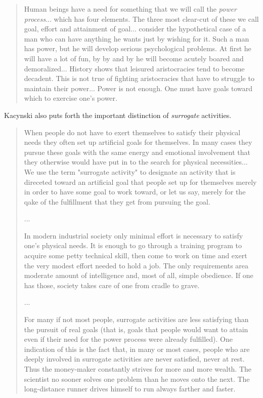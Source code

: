 \documentclass[letterpaper]{article}
\begin{document}
\begin{quote}
Human beings have a need for something that we will call the \textit{power process}... which has four elements. The three most clear-cut of these we call goal, effort and attainment of goal... consider the hypothetical case of a man who can have anything he wants just by wishing for it. Such a man has power, but he will develop serious psychological problems. At first he will have a lot of fun, by by and by he will become acutely boared and demoralized... History shows that leisured aristocracies tend to become decadent. This is not true of fighting aristocracies that have to struggle to maintain their power... Power is not enough. One must have goals toward which to exercise one's power.
\end{quote}

Kacynski also puts forth the important distinction of \textit{surrogate} activities.

\begin{quote}
When people do not have to exert themselves to satisfy their physical needs they often set up artificial goals for themselves. In many cases they pursue these goals with the same energy and emotional involvement that they otherwise would have put in to the search for physical necessities... We use the term "surrogate activity" to designate an activity that is direceted toward an artificial goal that people set up for themselves merely in order to have some goal to work toward, or let us say, merely for the qake of the fulfillment that they get from pursuing the goal.

...

In modern industrial society only minimal effort is necessary to satisfy one's physical needs. It is enough to go through a training program to acquire some petty technical skill, then come to work on time and exert the very modest effort needed to hold a job. The only requirements area moderate amount of intelligence and, most of all, simple obedience. If one has those, society takes care of one from cradle to grave.

...

For many if not most people, surrogate activities are less satisfying than the pursuit of real goals (that is, goals that people would want to attain even if their need for the power process were already fulfilled). One indication of this is the fact that, in many or most cases, people who are deeply involved in surrogate activities are never satisfied, never at rest. Thus the money-maker constantly strives for more and more wealth. The scientist no sooner solves one problem than he moves onto the next. The long-distance runner drives himself to run always farther and faster.
\end{quote}
\end{document}
